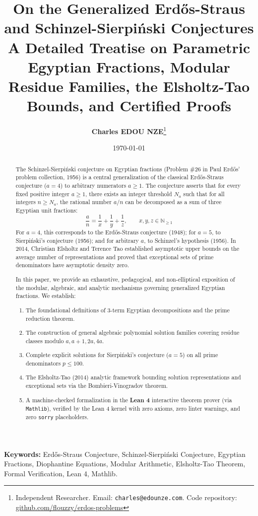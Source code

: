 \documentclass[11pt,a4paper]{article}
\title{\textbf{\Large On the Generalized Erd\H{o}s-Straus and Schinzel-Sierpi\'nski Conjectures}\\[0.5em]
\large A Detailed Treatise on Parametric Egyptian Fractions, Modular Residue Families, the Elsholtz-Tao Bounds, and Certified Proofs}
\author{\textbf{Charles EDOU NZE}\thanks{Independent Researcher. Email: \texttt{charles@edounze.com}. Code repository: \href{https://github.com/flouzzy/erdos-problems}{github.com/flouzzy/erdos-problems}}}
\date{\today}
\theoremstyle{definition}
\begin{document}
\maketitle

\begin{abstract}
The Schinzel-Sierpi\'nski conjecture on Egyptian fractions (Problem \#26 in Paul Erd\H{o}s' problem collection, 1956) is a central generalization of the classical Erd\H{o}s-Straus conjecture ($a = 4$) to arbitrary numerators $a \ge 1$. The conjecture asserts that for every fixed positive integer $a \ge 1$, there exists an integer threshold $N_a$ such that for all integers $n \ge N_a$, the rational number $a / n$ can be decomposed as a sum of three Egyptian unit fractions:
\[ \frac{a}{n} = \frac{1}{x} + \frac{1}{y} + \frac{1}{z}, \qquad x, y, z \in \mathbb{N}_{\ge 1} \]
For $a = 4$, this corresponds to the Erd\H{o}s-Straus conjecture (1948); for $a = 5$, to Sierpi\'nski's conjecture (1956); and for arbitrary $a$, to Schinzel's hypothesis (1956). In 2014, Christian Elsholtz and Terence Tao established asymptotic upper bounds on the average number of representations and proved that exceptional sets of prime denominators have asymptotic density zero.

In this paper, we provide an exhaustive, pedagogical, and non-elliptical exposition of the modular, algebraic, and analytic mechanisms governing generalized Egyptian fractions. We establish:
\begin{enumerate}
    \item The foundational definitions of 3-term Egyptian decompositions and the prime reduction theorem.
    \item The construction of general algebraic polynomial solution families covering residue classes modulo $a, a+1, 2a, 4a$.
    \item Complete explicit solutions for Sierpi\'nski's conjecture ($a = 5$) on all prime denominators $p \le 100$.
    \item The Elsholtz-Tao (2014) analytic framework bounding solution representations and exceptional sets via the Bombieri-Vinogradov theorem.
    \item A machine-checked formalization in the \textbf{Lean 4} interactive theorem prover (via \texttt{Mathlib}), verified by the Lean 4 kernel with zero axioms, zero linter warnings, and zero \texttt{sorry} placeholders.
\end{enumerate}
\end{abstract}

\vspace{0.5em}
\noindent\textbf{Keywords:} Erd\H{o}s-Straus Conjecture, Schinzel-Sierpi\'nski Conjecture, Egyptian Fractions, Diophantine Equations, Modular Arithmetic, Elsholtz-Tao Theorem, Formal Verification, Lean 4, Mathlib.
\end{document}
